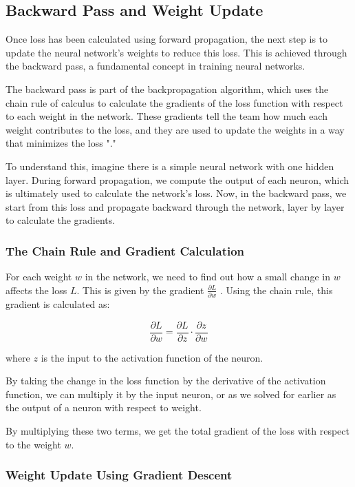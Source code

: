 \subsection*{Backward Pass and Weight Update}

Once loss has been calculated using forward propagation, the next step is to update the neural network's weights to reduce this loss. This is achieved through the backward pass, a fundamental concept in training neural networks.

The backward pass is part of the backpropagation algorithm, which uses the chain rule of calculus to calculate the gradients of the loss function with respect to each weight in the network. These gradients tell the team how much each weight contributes to the loss, and they are used to update the weights in a way that minimizes the loss "\cite{3b1b_2}."

To understand this, imagine there is a simple neural network with one hidden layer. During forward propagation, we compute the output of each neuron, which is ultimately used to calculate the network's loss. Now, in the backward pass, we start from this loss and propagate backward through the network, layer by layer to calculate the gradients.

\subsubsection*{The Chain Rule and Gradient Calculation}

For each weight $w$ in the network, we need to find out how a small change in
$w$ affects the loss 
$L$. This is given by the gradient 
$\frac{\partial L}{\partial w}$
 . Using the chain rule, this gradient is calculated as:

\[\frac{\partial L}{\partial w} = \frac{\partial L}{\partial z} \cdot \frac{\partial z}{\partial w}\]
 
where $z$ is the input to the activation function of the neuron.

By taking the change in the loss function by the derivative of the activation function, we can multiply it by the input neuron, or as we solved for earlier as the output of a neuron with respect to weight.

By multiplying these two terms, we get the total gradient of the loss with respect to the weight 
$w$.

\subsubsection*{Weight Update Using Gradient Descent}

